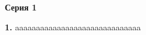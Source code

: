 \documentclass[12pt,a4paper]{article}
\def\q#1.{{\bf #1.}}
\theoremstyle{definition}
\begin{document}
\thispagestyle{firststyle}

\centerline{\bf Серия 1}


\q1. aaaaaaaaaaaaaaaaaaaaaaaaaaaaaa
\end{document}
